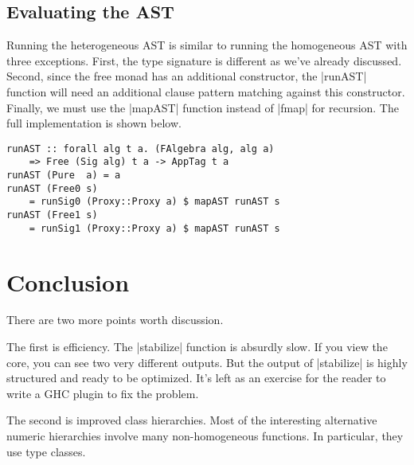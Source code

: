 \documentclass[preprint]{sigplanconf}
\theoremstyle{definition}
\begin{document}
\subsection{Evaluating the AST}
\label{sec:heteval}

Running the heterogeneous AST is similar to running the homogeneous AST with three exceptions.
First, the type signature is different as we've already discussed.
Second, since the free monad has an additional constructor,
the |runAST| function will need an additional clause pattern matching against this constructor.
Finally, we must use the |mapAST| function instead of |fmap| for recursion.
The full implementation is shown below.
\begin{lstlisting}
runAST :: forall alg t a. (FAlgebra alg, alg a)
    => Free (Sig alg) t a -> AppTag t a
runAST (Pure  a) = a
runAST (Free0 s)
    = runSig0 (Proxy::Proxy a) $ mapAST runAST s
runAST (Free1 s)
    = runSig1 (Proxy::Proxy a) $ mapAST runAST s
\end{lstlisting}

\section{Conclusion}

There are two more points worth discussion.

The first is efficiency.
The |stabilize| function is absurdly slow.
If you view the core, you can see two very different outputs.
But the output of |stabilize| is highly structured and ready to be optimized.
It's left as an exercise for the reader to write a GHC plugin to fix the problem.

The second is improved class hierarchies.
Most of the interesting alternative numeric hierarchies involve many non-homogeneous functions.
In particular, they use type classes.



%
%
%
%




\end{document}
